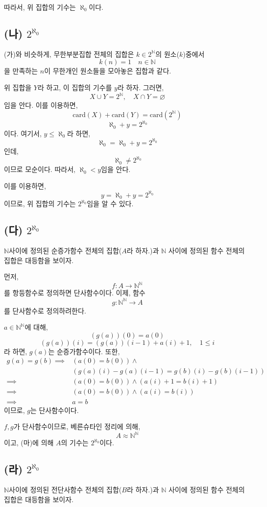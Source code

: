 \documentclass{article}
\begin{document}
따라서, 위 집합의 기수는 $\aleph_0$이다.
\subsection{(나) $2^{\aleph_0}$}
(가)와 비슷하게, 무한부분집합 전체의 집합은 $k \in 2^\mathbb{N}$의 원소($k$)중에서
$$k(n) = 1 \quad n \in \mathbb{N}$$을 만족하는 $n$이 무한개인 원소들을 모아놓은 집합과 같다.

위 집합을 $Y$라 하고, 이 집합의 기수를 $y$라 하자. 그러면,
$$X \cup Y = 2^\mathbb{N}, \quad X \cap Y = \varnothing$$
임을 안다. 이를 이용하면,
$$\text{card}(X) + \text{card}(Y) = \text{card}(2^{\mathbb{N}})$$
$$\aleph_0 + y = 2^{\aleph_0}$$
이다. 여기서, $y \le \aleph_0$라 하면,
$$\aleph_0 = \aleph_0 + y = 2^{\aleph_0}$$인데, $$\aleph_0 \neq 2^{\aleph_0}$$이므로 모순이다. 
따라서, $\aleph_0 < y$임을 안다.

이를 이용하면,
$$y = \aleph_0 + y = 2^{\aleph_0}$$
이므로, 위 집합의 기수는 $2^{\aleph_0}$임을 알 수 있다.

\subsection{(다) $2^{\aleph_0}$}
$\mathbb{N}$사이에 정의된 순증가함수 전체의 집합($A$라 하자.)과 $\mathbb{N}$ 사이에 정의된 함수 전체의 집합은 대등함을 보이자.

먼저, $$f : A \rightarrow \mathbb{N}^{\mathbb{N}}$$를 항등함수로 정의하면 단사함수이다.
이제, 함수
$$g : \mathbb{N}^{\mathbb{N}} \rightarrow A$$를 단사함수로 정의하려한다.

$a \in \mathbb{N}^{\mathbb{N}}$에 대해,
$$(g(a))(0) = a(0)$$
$$(g(a))(i) = (g(a))(i-1) + a(i) + 1, \quad 1 \le i$$라 하면,
$g(a)$는 순증가함수이다. 또한,
\begin{align*}
g(a) = g(b) \implies& (a(0) = b(0)) \wedge \tag{$1 \le i$}
\\ & (g(a)(i) - g(a)(i-1) = g(b)(i) - g(b)(i-1))
\\ \implies& (a(0) = b(0)) \wedge (a(i)+1 = b(i)+1) \tag{$1 \le i$}
\\ \implies& (a(0) = b(0)) \wedge (a(i) = b(i)) \tag{$1 \le i$}
\\ \implies& a = b
\end{align*}이므로, $g$는 단사함수이다.

$f, g$가 단사함수이므로, 베른슈타인 정리에 의해,
$$ A \approx  \mathbb{N}^{\mathbb{N}}$$
이고, (마)에 의해 $A$의 기수는 $2^{\aleph_0}$이다.

\subsection{(라) $2^{\aleph_0}$}
$\mathbb{N}$사이에 정의된 전단사함수 전체의 집합($B$라 하자.)과 $\mathbb{N}$ 사이에 정의된 함수 전체의 집합은 대등함을 보이자.
\end{document}
